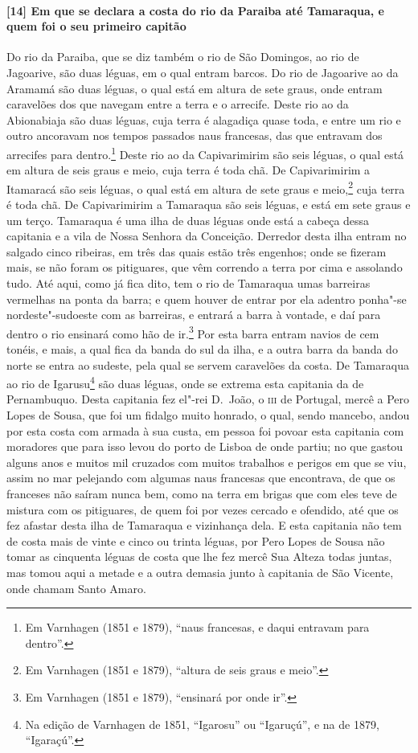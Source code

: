 \paragraph{[14] Em que se declara a costa do rio da Paraiba até Tamaraqua, e quem foi o seu
primeiro capitão} \quad
Do rio da Paraiba, que se diz também o rio de São Domingos, ao rio de Jagoarive, são duas
léguas, em o qual entram barcos. Do rio de Jagoarive ao da Aramamá são duas léguas, o qual
está em altura de sete graus, onde entram caravelões dos que navegam entre a terra e o
arrecife. Deste rio ao da Abionabiaja são duas léguas, cuja terra é alagadiça quase toda,
e entre um rio e outro ancoravam nos tempos passados naus francesas, das que entravam dos
arrecifes para dentro.\footnote{ Em Varnhagen (1851 e 1879), ``naus francesas, e daqui
entravam para dentro''.} Deste rio ao da Capivarimirim são seis léguas, o qual está em
altura de seis graus e meio, cuja terra é toda chã. De Capivarimirim a Itamaracá são seis
léguas, o qual está em altura de sete graus e meio,\footnote{ Em Varnhagen (1851 e 1879),
``altura de seis graus e meio''.} cuja terra é toda chã. De Capivarimirim a Tamaraqua são
seis léguas, e está em sete graus e um terço. Tamaraqua é uma ilha de duas léguas onde
está a cabeça dessa capitania e a vila de Nossa Senhora da Conceição. Derredor desta ilha
entram no salgado cinco ribeiras, em três das quais estão três engenhos; onde se fizeram
mais, se não foram os pitiguares, que vêm correndo a terra por cima e assolando tudo. Até
aqui, como já fica dito, tem o rio de Tamaraqua umas barreiras vermelhas na ponta da
barra; e quem houver de entrar por ela adentro ponha"-se nordeste"-sudoeste com as
barreiras, e entrará a barra à vontade, e daí para dentro o rio ensinará como hão de
ir.\footnote{ Em Varnhagen (1851 e 1879), ``ensinará por onde ir''.} Por esta barra entram
navios de cem tonéis, e mais, a qual fica da banda do sul da ilha, e a outra barra da
banda do norte se entra ao sudeste, pela qual se servem caravelões da costa. De Tamaraqua
ao rio de Igarusu\footnote{ Na edição de Varnhagen de 1851, ``Igarosu'' ou ``Igaruçú'', e
na de 1879, ``Igaraçú''.} são duas léguas, onde se extrema esta capitania da de
Pernambuquo. Desta capitania fez el"-rei D.~João, o \textsc{iii} de Portugal, mercê a Pero
Lopes de Sousa, que foi um fidalgo muito honrado, o qual, sendo mancebo, andou por esta
costa com armada à sua custa, em pessoa foi povoar esta capitania com moradores que para
isso levou do porto de Lisboa de onde partiu; no que gastou alguns anos e muitos mil
cruzados com muitos trabalhos e perigos em que se viu, assim no mar pelejando com algumas
naus francesas que encontrava, de que os franceses não saíram nunca bem, como na terra em
brigas que com eles teve de mistura com os pitiguares, de quem foi por vezes cercado e
ofendido, até que os fez afastar desta ilha de Tamaraqua e vizinhança dela. E esta
capitania não tem de costa mais de vinte e cinco ou trinta léguas, por Pero Lopes de Sousa
não tomar as cinquenta léguas de costa que lhe fez mercê Sua Alteza todas juntas, mas
tomou aqui a metade e a outra demasia junto à capitania de São Vicente, onde chamam Santo
Amaro.

